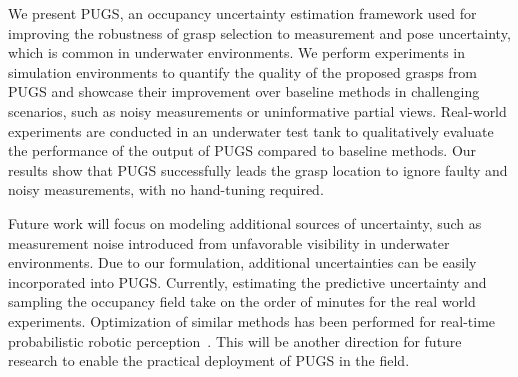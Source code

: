 We present PUGS, an occupancy uncertainty estimation framework used for improving the robustness of grasp selection to measurement and pose uncertainty, which is common in underwater environments.
We perform experiments in simulation environments to quantify the quality of the proposed grasps from PUGS and showcase their improvement over baseline methods in challenging scenarios, such as noisy measurements or uninformative partial views. 
Real-world experiments are conducted in an underwater test tank to qualitatively evaluate the performance of the output of PUGS compared to baseline methods. Our results show that PUGS successfully leads the grasp location to ignore faulty and noisy measurements, with no hand-tuning required.

Future work will focus on modeling additional sources of uncertainty, such as measurement noise introduced from unfavorable visibility in underwater environments. 
Due to our formulation, additional uncertainties can be easily incorporated into PUGS. 
Currently, estimating the predictive uncertainty and sampling the occupancy field take on the order of minutes for the real world experiments. Optimization of similar methods has been performed for real-time probabilistic robotic perception~\cite{10093134}. This will be another direction for future research to enable the practical deployment of PUGS in the field.